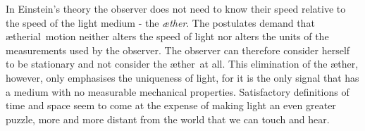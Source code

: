 \documentclass[10pt, fleqn,final,showtrims,oldfontcommands, article,a4paper,oneside]{memoir} %
\newcommand{\aether}{\ae ther}
\newcommand{\aetherial}{\ae therial}
\newcommand*\herself {herself\xspace}
\begin{document}
In Einstein's  theory the observer does  not need to know their speed relative to the speed of the light medium - the {\em \aether}.
The postulates demand that \aetherial\ motion  neither alters the speed of light
nor alters the units of the measurements used by the observer.
%
The observer can therefore consider \herself to be stationary and not consider the \aether\ at all.
This elimination of the \aether, however, only emphasises the uniqueness of light, for it is the  only  signal that has a  medium with no measurable mechanical properties.
Satisfactory definitions of time and space seem to come at the expense of making light  an even greater puzzle,
more and more distant from the world that we can touch and hear.
\end{document}
